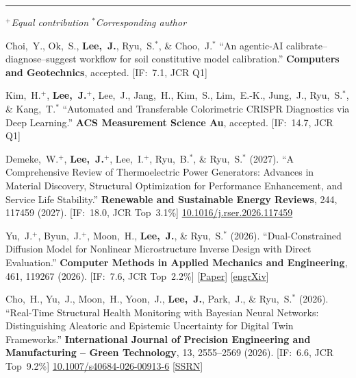 \documentclass[11pt, a4paper]{article}
\newenvironment{cvsec}[1]{%
  \par\vspace{0.9em}%
  \noindent{\large\bfseries #1}\par\nobreak%
  \vspace{2pt}%
  \noindent\rule{\linewidth}{0.4pt}\par\nobreak%
  \vspace{3pt}%
  \noindent%
}{%
  \vspace{2pt}%
}
\newenvironment{pubrev}[1]{%
  \begin{etaremune}[leftmargin=2em, itemsep=5pt, parsep=0pt, topsep=0pt, partopsep=0pt, start=#1]%
}{%
  \end{etaremune}%
}
\begin{document}
\begin{cvsec}{Publications}

\textit{$^+$Equal contribution \quad $^*$Corresponding author}

\begin{pubrev}{18}

\item Choi,~Y., Ok,~S., \textbf{Lee,~J.}, Ryu,~S.$^*$, \& Choo,~J.$^*$
``An agentic-AI calibrate--diagnose--suggest workflow for soil constitutive model calibration.''
\textbf{Computers and Geotechnics}, accepted. [IF:~7.1, JCR Q1]

\item Kim,~H.$^+$, \textbf{Lee,~J.}$^+$, Lee,~J., Jang,~H., Kim,~S., Lim,~E.-K., Jung,~J., Ryu,~S.$^*$, \& Kang,~T.$^*$
``Automated and Transferable Colorimetric CRISPR Diagnostics via Deep Learning.''
\textbf{ACS Measurement Science Au}, accepted. [IF:~14.7, JCR Q1]

\item Demeke,~W.$^+$, \textbf{Lee,~J.}$^+$, Lee,~I.$^+$, Ryu,~B.$^*$, \& Ryu,~S.$^*$ (2027).
``A Comprehensive Review of Thermoelectric Power Generators: Advances in Material Discovery, Structural Optimization for Performance Enhancement, and Service Life Stability.''
\textbf{Renewable and Sustainable Energy Reviews}, 244, 117459 (2027). [IF:~18.0, JCR Top~3.1\%]
\href{https://doi.org/10.1016/j.rser.2026.117459}{10.1016/j.rser.2026.117459}

\item Yu,~J.$^+$, Byun,~J.$^+$, Moon,~H., \textbf{Lee,~J.}, \& Ryu,~S.$^*$ (2026).
``Dual-Constrained Diffusion Model for Nonlinear Microstructure Inverse Design with Direct Evaluation.''
\textbf{Computer Methods in Applied Mechanics and Engineering}, 461, 119267 (2026). [IF:~7.6, JCR Top~2.2\%]
[\href{https://www.sciencedirect.com/science/article/pii/S0045782526005402}{Paper}]
[\href{https://engrxiv.org/preprint/view/7672/version/9902}{engrXiv}]

\item Cho,~H., Yu,~J., Moon,~H., Yoon,~J., \textbf{Lee,~J.}, Park,~J., \& Ryu,~S.$^*$ (2026).
``Real-Time Structural Health Monitoring with Bayesian Neural Networks: Distinguishing Aleatoric and Epistemic Uncertainty for Digital Twin Frameworks.''
\textbf{International Journal of Precision Engineering and Manufacturing -- Green Technology}, 13, 2555--2569 (2026). [IF:~6.6, JCR Top~9.2\%]
\href{https://doi.org/10.1007/s40684-026-00913-6}{10.1007/s40684-026-00913-6}
[\href{https://papers.ssrn.com/sol3/papers.cfm?abstract_id=5549564}{SSRN}]


\end{pubrev}
\end{cvsec}
\end{document}
